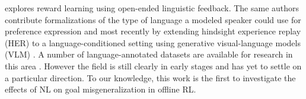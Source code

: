 \documentclass[../thesis-proposal/main.tex]{subfiles}
\begin{document}
 explores reward learning using open-ended linguistic feedback. The same
authors contribute formalizations of the type of language a modeled speaker could use for preference
expression \citep{sumers_how_2022} and most recently by extending hindsight experience replay (HER)
\citep{andrychowicz_hindsight_2017} to a language-conditioned setting using generative
visual-language models (VLM) \citep{alayrac_flamingo_2022}. A number of language-annotated datasets
are available for research in this area \citep{zholus_iglu_2022, mees_calvin_2022,
fan_minedojo_2022, shridhar_alfred_2020, jiang_yunfan_vima_2022, liu_reinforcement_2022}. However
the field is still clearly in early stages and has yet to settle on a particular direction. To our
knowledge, this work is the first to investigate the effects of NL on goal misgeneralization in
offline RL.


\ifSubfilesClassLoaded{%
  
}{}
\end{document}

